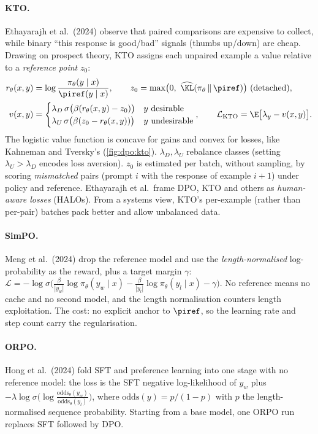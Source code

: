 \paragraph{KTO.} Ethayarajh et al.\ (2024) observe that paired comparisons are expensive to
collect, while binary ``this response is good/bad'' signals (thumbs up/down) are cheap. Drawing on
prospect theory, KTO assigns each unpaired example a value relative to a \emph{reference point}
$z_0$:
\begin{align}
r_\theta(x,y)&=\log\frac{\pi_\theta(y\mid x)}{\piref(y\mid x)},\qquad
z_0=\max\!\big(0,\ \widehat{\KL}(\pi_\theta\,\|\,\piref)\big)\ \text{(detached)},\\
v(x,y)&=\begin{cases}\lambda_D\,\sigma\big(\beta(r_\theta(x,y)-z_0)\big) & y\ \text{desirable}\\
\lambda_U\,\sigma\big(\beta(z_0-r_\theta(x,y))\big) & y\ \text{undesirable}\end{cases},\qquad
\mathcal{L}_{\text{KTO}}=\E\big[\lambda_y-v(x,y)\big].
\end{align}
The logistic value function is concave for gains and convex for losses, like Kahneman and
Tversky's (\cref{fig:dpo:kto}). $\lambda_D,\lambda_U$ rebalance classes (setting $\lambda_U>\lambda_D$
encodes loss aversion). $z_0$ is estimated per batch, without sampling, by scoring
\emph{mismatched} pairs (prompt $i$ with the response of example $i{+}1$) under policy and
reference. Ethayarajh et al.\ frame DPO, KTO and others as \emph{human-aware losses} (HALOs).
From a systems view, KTO's per-example (rather than per-pair) batches pack better and allow
unbalanced data.

\paragraph{SimPO.} Meng et al.\ (2024) drop the reference model and use the
\emph{length-normalised} log-probability as the reward, plus a target margin $\gamma$:
$\mathcal{L}=-\log\sigma\big(\frac{\beta}{|y_w|}\log\pi_\theta(y_w\mid x)-\frac{\beta}{|y_l|}\log\pi_\theta(y_l\mid x)-\gamma\big)$.
No reference means no cache and no second model, and the length normalisation counters length
exploitation. The cost: no explicit anchor to $\piref$, so the learning rate and step count
carry the regularisation.

\paragraph{ORPO.} Hong et al.\ (2024) fold SFT and preference learning into one stage with no
reference model: the loss is the SFT negative log-likelihood of $y_w$ plus
$-\lambda\log\sigma\big(\log\frac{\text{odds}_\theta(y_w)}{\text{odds}_\theta(y_l)}\big)$, where
$\text{odds}(y)=p/(1-p)$ with $p$ the length-normalised sequence probability. Starting from a base
model, one ORPO run replaces SFT followed by DPO.

